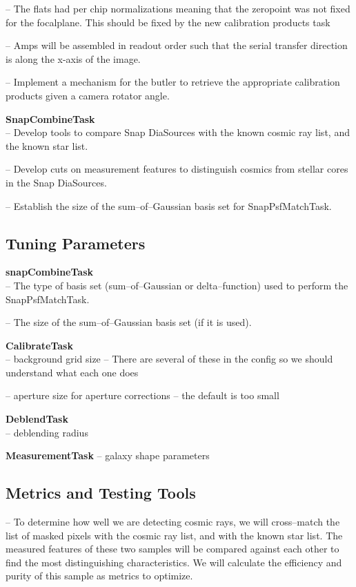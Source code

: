 \documentclass[12pt]{article}
\begin{document}
-- The flats had per chip normalizations meaning that the zeropoint was not fixed for the focalplane.  This should be
fixed by the new calibration products task

-- Amps will be assembled in readout order such that the serial transfer direction is along the x-axis of the image.

-- Implement a mechanism for the butler to retrieve the appropriate calibration products given a camera rotator angle.

{\bf SnapCombineTask}\\
-- Develop tools to compare Snap DiaSources with the known cosmic ray
list, and the known star list.

-- Develop cuts on measurement features to distinguish cosmics from
stellar cores in the Snap DiaSources.

-- Establish the size of the sum--of--Gaussian basis set for SnapPsfMatchTask.



\subsection{Tuning Parameters}
{\bf snapCombineTask}\\
-- The type of basis set (sum--of--Gaussian or delta--function) used
to perform the SnapPsfMatchTask.

-- The size of the sum--of--Gaussian basis set (if it is used).

{\bf CalibrateTask}\\
-- background grid size -- There are several of these in the config
  so we should understand what each one does

-- aperture size for aperture corrections -- the default is too small

{\bf DeblendTask}\\
-- deblending radius

{\bf MeasurementTask}
-- galaxy shape parameters

\subsection{Metrics and Testing Tools}

-- To determine how well we are detecting cosmic rays, we will
cross--match the list of masked pixels with the cosmic ray list, and
with the known star list.  The measured features of these two samples
will be compared against each other to find the most distinguishing
characteristics.  We will calculate the efficiency and purity of this
sample as metrics to optimize.
\end{document}
